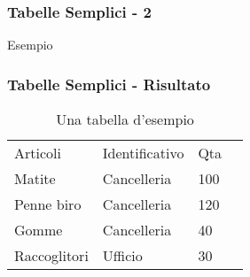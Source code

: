 \begin{frame}[fragile]

  \frametitle{Tabelle Semplici - 2}

  \begin{exampleblock}{Esempio}
    
  \end{exampleblock}

\end{frame}

\begin{frame}
 
  \frametitle{Tabelle Semplici - Risultato}
  
  \begin{table}[h!]
    \centering
    \begin{tabular}{llll}
    Articoli      & Identificativo & Qta \\
    Matite        & Cancelleria    & 100 \\
    Penne biro    & Cancelleria    & 120 \\
    Gomme         & Cancelleria    & 40  \\
    Raccoglitori  & Ufficio        & 30
\end{tabular}
\caption{Una tabella d'esempio}
\label{tabella:esempio}
\end{table} 
\end{frame}
